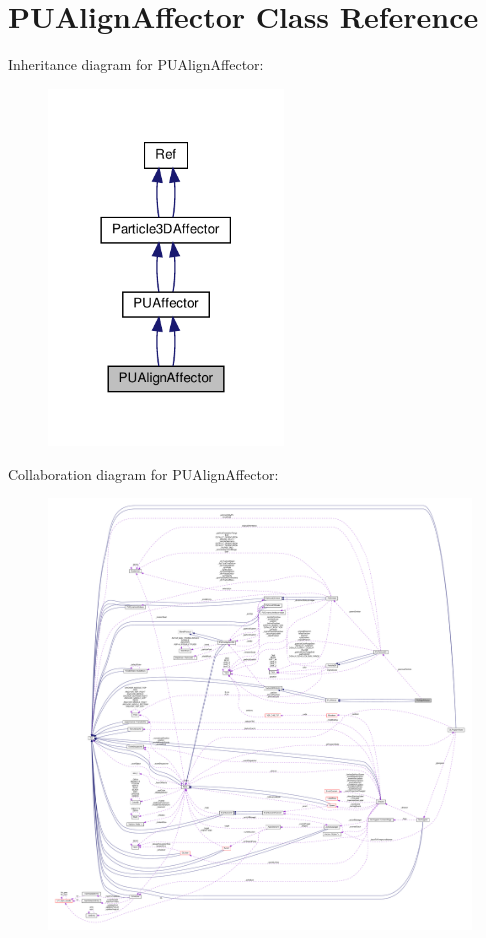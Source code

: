 \hypertarget{classPUAlignAffector}{}\section{P\+U\+Align\+Affector Class Reference}
\label{classPUAlignAffector}


Inheritance diagram for P\+U\+Align\+Affector\+:
\nopagebreak
\begin{figure}[H]
\begin{center}
\leavevmode
\includegraphics[width=177pt]{classPUAlignAffector__inherit__graph}
\end{center}
\end{figure}


Collaboration diagram for P\+U\+Align\+Affector\+:
\nopagebreak
\begin{figure}[H]
\begin{center}
\leavevmode
\includegraphics[width=350pt]{classPUAlignAffector__coll__graph}
\end{center}
\end{figure}
